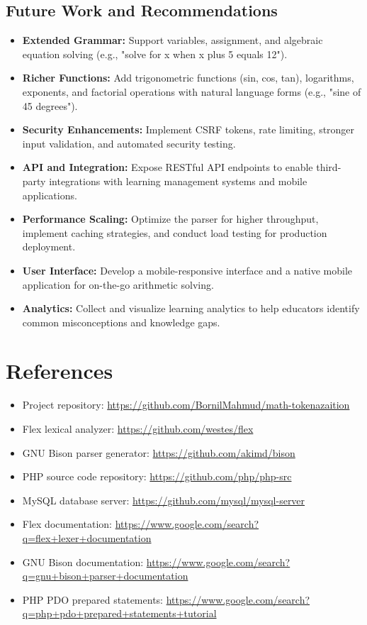 \documentclass[12pt,a4paper]{report}
\begin{document}
\section{Future Work and Recommendations}

\begin{itemize}
\item \textbf{Extended Grammar:} Support variables, assignment, and algebraic equation solving (e.g., "solve for x when x plus 5 equals 12").
\item \textbf{Richer Functions:} Add trigonometric functions (sin, cos, tan), logarithms, exponents, and factorial operations
with natural language forms (e.g., "sine of 45 degrees").
\item \textbf{Security Enhancements:} Implement CSRF tokens, rate limiting, stronger input validation, and automated security testing.
\item \textbf{API and Integration:} Expose RESTful API endpoints to enable third-party integrations with learning management systems
and mobile applications.
\item \textbf{Performance Scaling:} Optimize the parser for higher throughput, implement caching strategies, and conduct load testing
for production deployment.
\item \textbf{User Interface:} Develop a mobile-responsive interface and a native mobile application for on-the-go arithmetic solving.
\item \textbf{Analytics:} Collect and visualize learning analytics to help educators identify common misconceptions and knowledge gaps.
\end{itemize}

\chapter*{References}

\begin{itemize}
\item Project repository: \url{https://github.com/BornilMahmud/math-tokenazaition}
\item Flex lexical analyzer: \url{https://github.com/westes/flex}
\item GNU Bison parser generator: \url{https://github.com/akimd/bison}
\item PHP source code repository: \url{https://github.com/php/php-src}
\item MySQL database server: \url{https://github.com/mysql/mysql-server}
\item Flex documentation: \url{https://www.google.com/search?q=flex+lexer+documentation}
\item GNU Bison documentation: \url{https://www.google.com/search?q=gnu+bison+parser+documentation}
\item PHP PDO prepared statements: \url{https://www.google.com/search?q=php+pdo+prepared+statements+tutorial}
\end{itemize}
\end{document}
